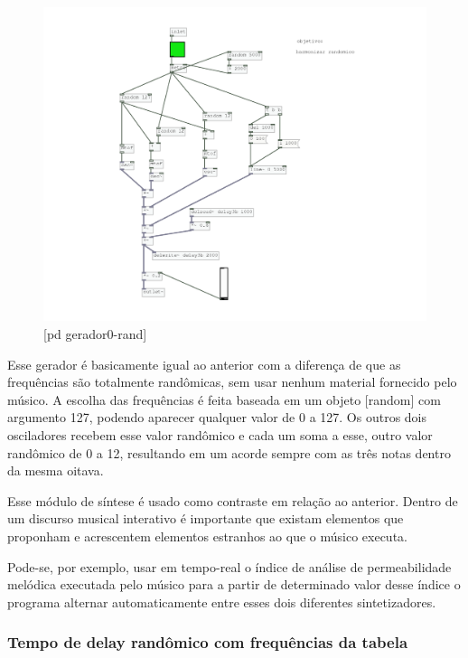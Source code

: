\documentclass{ppgmus}
\begin{document}
\begin{figure}
\includegraphics[scale=.6]{gerador-sintese0-rand}
\caption{[pd gerador0-rand]}
\label{gerador0rand}
\end{figure}


Esse gerador é basicamente igual ao anterior com a diferença de que
as frequências são totalmente randômicas, sem usar nenhum material
fornecido pelo músico. A escolha das frequências é feita baseada em um
objeto [random] com argumento 127, podendo aparecer qualquer valor de 0 a 127.
Os outros dois osciladores recebem esse valor randômico e cada um soma a esse,
outro valor randômico de 0 a 12, resultando em um acorde sempre com as três
notas dentro da mesma oitava.

Esse módulo de síntese é usado como contraste em relação ao anterior.
Dentro de um discurso musical interativo é importante que existam elementos
que proponham e acrescentem elementos estranhos ao que o músico executa.

Pode-se, por exemplo, usar em tempo-real o índice de análise de permeabilidade 
melódica executada pelo músico para a partir de determinado valor desse índice
o programa alternar automaticamente entre esses dois diferentes sintetizadores.




\subsubsection{Tempo de delay randômico com frequências da tabela} 
\end{document}
